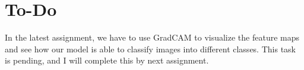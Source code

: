\section{To-Do}

In the latest assignment, we have to use GradCAM to visualize the feature maps and see how our model is able to classify images into different classes. This task is pending, and I will complete this by next assignment.